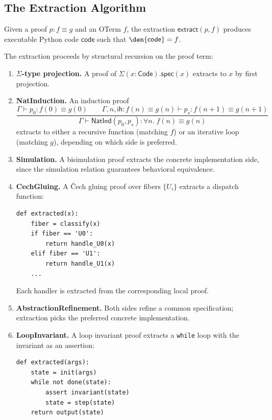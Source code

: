 \subsection{The Extraction Algorithm}

\begin{definition}
Given a proof $p : f \equiv g$ and an OTerm $f$, the extraction
$\mathsf{extract}(p, f)$ produces executable Python code $\mathsf{code}$
such that $\den{\mathsf{code}} = f$.
\end{definition}

The extraction proceeds by structural recursion on the proof term:

\begin{enumerate}
  \item \textbf{$\Sigma$-type projection.}  A proof of
    $\Sigma(x : \mathsf{Code}). \mathsf{spec}(x)$ extracts to $x$
    by first projection.

  \item \textbf{NatInduction.}  An induction proof
    \[
      \frac{\Gamma \vdash p_0 : f(0) \equiv g(0) \qquad
            \Gamma, n, \mathsf{ih} : f(n) \equiv g(n) \vdash p_s : f(n{+}1) \equiv g(n{+}1)}
           {\Gamma \vdash \mathsf{NatInd}(p_0, p_s) : \forall n.\; f(n) \equiv g(n)}
    \]
    extracts to either a recursive function (matching $f$) or an
    iterative loop (matching $g$), depending on which side is preferred.

  \item \textbf{Simulation.}  A bisimulation proof extracts the
    concrete implementation side, since the simulation relation
    guarantees behavioral equivalence.

  \item \textbf{CechGluing.}  A \v{C}ech gluing proof over fibers
    $\{U_i\}$ extracts a dispatch function:
    \begin{lstlisting}
def extracted(x):
    fiber = classify(x)
    if fiber == 'U0':
        return handle_U0(x)
    elif fiber == 'U1':
        return handle_U1(x)
    ...
    \end{lstlisting}
    Each handler is extracted from the corresponding local proof.

  \item \textbf{AbstractionRefinement.}  Both sides refine a common
    specification; extraction picks the preferred concrete implementation.

  \item \textbf{LoopInvariant.}  A loop invariant proof extracts a
    \texttt{while} loop with the invariant as an assertion:
    \begin{lstlisting}
def extracted(args):
    state = init(args)
    while not done(state):
        assert invariant(state)
        state = step(state)
    return output(state)
    \end{lstlisting}
\end{enumerate}

